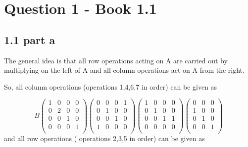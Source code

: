 \documentclass[a4paper,12pt]{article}
\begin{document}
\section{Question 1 - Book 1.1}

\subsection{1.1 part a}
The general idea is that all row operations acting on A are carried out by multiplying on the left of A and all column operations act on A from the right. 

So, all column operations (operations 1,4,6,7 in order) can be given as

\begin{equation}
B\begin{pmatrix}
1 & 0 &0 & 0 \\
0 & 2 &0 & 0\\
0 & 0 &1 & 0\\
0 & 0 &0 & 1\\
\end{pmatrix}
\begin{pmatrix}
0 & 0 &0 & 1 \\
0 & 1 &0 & 0\\
0 & 0 &1 & 0\\
1 & 0 &0 & 0\\
\end{pmatrix}
\begin{pmatrix}
1 & 0 &0 & 0 \\
0 & 1 &0 & 0\\
0 & 0 &1 & 1\\
0 & 0 &0 & 0\\
\end{pmatrix}
\begin{pmatrix}
 0 &0 & 0 \\
 1&0 & 0\\
 0 &1 & 0\\
 0 &0 & 1\\
\end{pmatrix}
\end{equation}
 and all row operations ( operations 2,3,5 in order) can be given as
 
\end{document}
